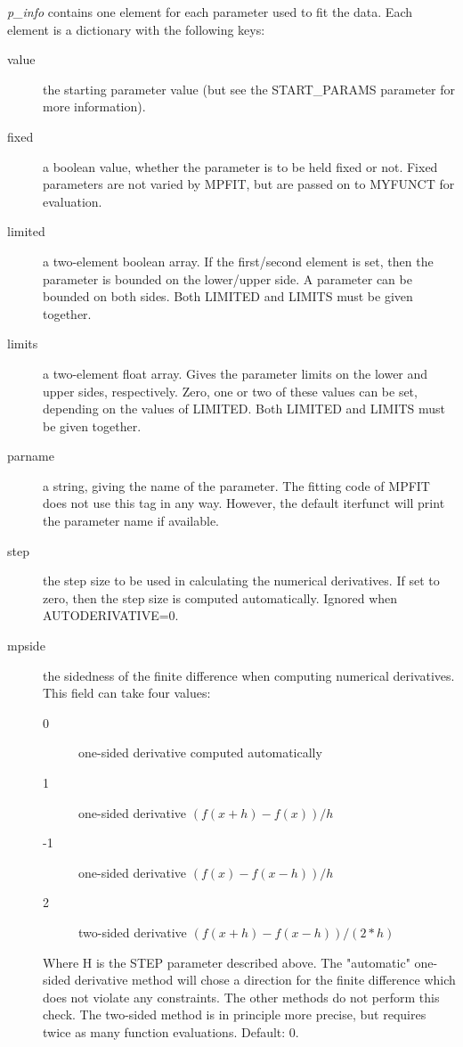 \documentclass[a4paper,11pt]{scrartcl}
\begin{document}
\textit{p\_info} contains one element for each parameter used to fit the data. Each element is a dictionary with the following keys:
\begin{description}
  \item[value] the starting parameter value (but see the START\_PARAMS parameter for more information).
  \item[fixed] a boolean value, whether the parameter is to be held fixed or not.  Fixed parameters are not varied by MPFIT, but are passed on to MYFUNCT for evaluation.
  \item[limited] a two-element boolean array.  If the first/second element is set, then the parameter is bounded on the lower/upper side.  A parameter can be bounded on both sides.  Both LIMITED and LIMITS must be given together.
  \item[limits] a two-element float array.  Gives the parameter limits on the lower and upper sides, respectively.  Zero, one or two of these values can be set, depending on the values of LIMITED.  Both LIMITED and LIMITS must be given together.
  \item[parname] a string, giving the name of the parameter.  The fitting code of MPFIT does not use this tag in any way.  However, the default iterfunct will print the parameter name if available.
  \item[step] the step size to be used in calculating the numerical derivatives.  If set to zero, then the step size is	computed automatically.  Ignored when AUTODERIVATIVE=0.
  \item[mpside] the sidedness of the finite difference when computing numerical derivatives.  This field can take four values:\\
    \begin{description}
      \item [0]one-sided derivative computed automatically
      \item [1]one-sided derivative $(f(x+h) - f(x)  )/h$
      \item [-1] one-sided derivative $(f(x)   - f(x-h))/h$
      \item [2] two-sided derivative $(f(x+h) - f(x-h))/(2*h)$
    \end{description}
	Where H is the STEP parameter described above.  The "automatic" one-sided derivative method will chose a direction for the finite difference which does not 			 violate any constraints.  The other methods do not perform this check.  The two-sided method is in principle more precise, but requires twice as many function evaluations.  Default: 0.

\end{description}
\end{document}
